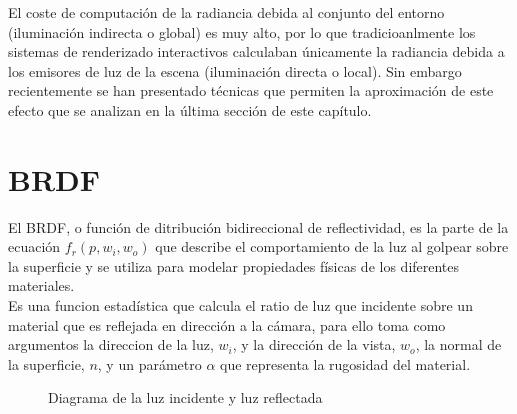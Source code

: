 El coste de computaci\'on de la radiancia debida al conjunto del entorno (iluminaci\'on indirecta o global) es muy alto, por lo que
tradicioanlmente los sistemas de renderizado interactivos calculaban \'unicamente la radiancia debida a los emisores de luz de la escena
(iluminaci\'on directa o local). Sin embargo recientemente se han presentado t\'ecnicas que permiten la aproximaci\'on
de este efecto que se analizan en la \'ultima secci\'on de este cap\'itulo.



\section{BRDF}

El BRDF, o función de ditribuci\'on bidireccional de reflectividad, es la parte de la ecuaci\'on $f_r(p, w_i, w_o)$ que describe el
comportamiento de la luz al golpear sobre la superficie y se utiliza para modelar propiedades f\'isicas de los diferentes
materiales.\\

Es una funcion estad\'istica que calcula el ratio de luz que incidente sobre un material que es reflejada en direcci\'on
a la c\'amara, para ello toma como argumentos la direccion de la luz, $w_i$, y la dirección de la vista,
$w_o$, la normal de la superficie, $n$, y un par\'ametro $\alpha$ que representa la rugosidad del material.

\begin{figure}[H]
    \vspace{0.5cm}
    \centering
    \caption{Diagrama de la luz incidente y luz reflectada}
    \vspace{0.5cm}
\end{figure}

